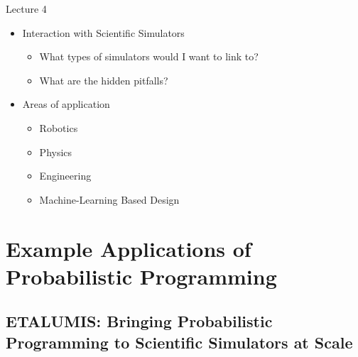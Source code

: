 \documentclass[AERbeamer%
              ,optEnglish%
              ,optBiber%
              ,optBibstyleAlphabetic%
              ,optBeamerClassicFormat%
              ]{AERlatex}%
\begin{document}
\begin{frame}[c]{Lecture 4}
    \centering
    \begin{itemize}
        \item Interaction with Scientific Simulators
        \begin{itemize}
            \item What types of simulators would I want to link to?
            \item What are the hidden pitfalls?
        \end{itemize}
        \item Areas of application
        \begin{itemize}
            \item Robotics
            \item Physics
            \item Engineering
            \item Machine-Learning Based Design
        \end{itemize}
    \end{itemize}
\end{frame}



\section{Example Applications of Probabilistic Programming}


\subsection{ETALUMIS: Bringing Probabilistic Programming to Scientific Simulators at Scale}
\end{document}
